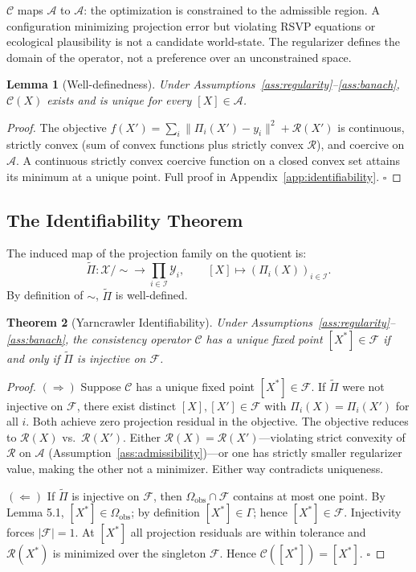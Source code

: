 \documentclass[12pt, oneside]{article}
\newtheorem{theorem}{Theorem}[section]
\newtheorem{lemma}[theorem]{Lemma}
\newcommand{\Xmod}{\mathcal{X}/{\sim}}
\newcommand{\Ftil}{\widetilde{\Pi}}
\begin{document}
$\mathcal{C}$ maps $\mathcal{A}$ to $\mathcal{A}$: the optimization is constrained to the
admissible region. A configuration minimizing projection error but violating RSVP equations
or ecological plausibility is not a candidate world-state. The regularizer defines the
domain of the operator, not a preference over an unconstrained space.

\begin{lemma}[Well-definedness]
Under Assumptions~\ref{ass:regularity}--\ref{ass:banach}, $\mathcal{C}(X)$ exists and is
unique for every $[X] \in \mathcal{A}$.
\end{lemma}
\begin{proof}
The objective $f(X') = \sum_i \|\Pi_i(X') - y_i\|^2 + \mathcal{R}(X')$ is continuous,
strictly convex (sum of convex functions plus strictly convex $\mathcal{R}$), and coercive
on $\mathcal{A}$. A continuous strictly convex coercive function on a closed convex set
attains its minimum at a unique point. Full proof in Appendix~\ref{app:identifiability}.
$\square$
\end{proof}

\subsection{The Identifiability Theorem}

The induced map of the projection family on the quotient is:
\[
\Ftil : \Xmod \longrightarrow \prod_{i \in \mathcal{I}} \mathcal{Y}_i, \qquad
[X] \mapsto (\Pi_i(X))_{i \in \mathcal{I}}.
\]
By definition of $\sim$, $\Ftil$ is well-defined.

\begin{theorem}[Yarncrawler Identifiability]
\label{thm:identifiability}
Under Assumptions~\ref{ass:regularity}--\ref{ass:banach}, the consistency operator
$\mathcal{C}$ has a unique fixed point $[X^*] \in \mathcal{F}$ if and only if $\Ftil$
is injective on $\mathcal{F}$.
\end{theorem}

\begin{proof}
$(\Rightarrow)$ Suppose $\mathcal{C}$ has a unique fixed point $[X^*] \in \mathcal{F}$.
If $\Ftil$ were not injective on $\mathcal{F}$, there exist distinct $[X],[X'] \in \mathcal{F}$
with $\Pi_i(X) = \Pi_i(X')$ for all $i$. Both achieve zero projection residual in the
objective. The objective reduces to $\mathcal{R}(X)$ vs.\ $\mathcal{R}(X')$. Either
$\mathcal{R}(X) = \mathcal{R}(X')$---violating strict convexity of $\mathcal{R}$ on
$\mathcal{A}$ (Assumption~\ref{ass:admissibility})---or one has strictly smaller
regularizer value, making the other not a minimizer. Either way contradicts uniqueness.

$(\Leftarrow)$ If $\Ftil$ is injective on $\mathcal{F}$, then $\Omega_{\mathrm{obs}} \cap
\mathcal{F}$ contains at most one point. By Lemma 5.1, $[X^*] \in \Omega_{\mathrm{obs}}$;
by definition $[X^*] \in \Gamma$; hence $[X^*] \in \mathcal{F}$. Injectivity forces
$|\mathcal{F}| = 1$. At $[X^*]$ all projection residuals are within tolerance and
$\mathcal{R}(X^*)$ is minimized over the singleton $\mathcal{F}$. Hence
$\mathcal{C}([X^*]) = [X^*]$. $\square$
\end{proof}
\end{document}
